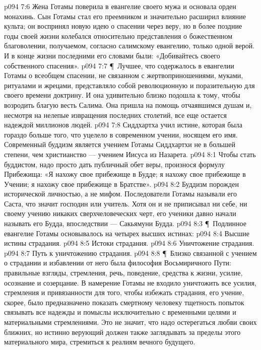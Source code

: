 \vs p094 7:6 Жена Готамы поверила в евангелие своего мужа и основала орден монахинь. Сын Готамы стал его преемником и значительно расширил влияние культа; он воспринял новую идею о спасении через веру, но в более поздние годы своей жизни колебался относительно представления о божественном благоволении, получаемом, согласно салимскому евангелию, только одной верой. И в конце жизни последними его словами были: «Добивайтесь своего собственного спасения».
\vs p094 7:7 \P\ Лучшее, что содержалось в евангелии Готамы о всеобщем спасении, не связанном с жертвоприношениями, муками, ритуалами и жрецами, представляло собой революционную и поразительную для своего времени доктрину. И она удивительно близко подошла к тому, чтобы возродить благую весть Салима. Она пришла на помощь отчаявшимся душам и, несмотря на нелепые извращения последних столетий, все еще остается надеждой миллионов людей.
\vs p094 7:8 Сиддхартха учил истине, которая была гораздо больше того, что уцелело в современном учении, носящем его имя. Современный буддизм является учением Готамы Сиддхартхи не в большей степени, чем христианство --- учением Иисуса из Назарета.
\vs p094 8:1 Чтобы стать буддистом, надо просто дать публичный обет веры, произнося формулу Прибежища: «Я нахожу свое прибежище в Будде; я нахожу свое прибежище в Учении; я нахожу свое прибежище в Братстве».
\vs p094 8:2 Буддизм порожден исторической личностью, а не мифом. Последователи Готамы называли его Саста, что значит господин или учитель. Хотя он и не приписывал ни себе, ни своему учению никаких сверхчеловеческих черт, его ученики давно начали называть его  Будда, впоследствии --- Сакьямуни Будда.
\vs p094 8:3 \P\ Подлинное евангелие Готамы основывалось на четырех высших истинах:
\vs p094 8:4 \bibnobreakspace Высшие истины страдания.
\vs p094 8:5 \bibnobreakspace Истоки страдания.
\vs p094 8:6 \bibnobreakspace Уничтожение страдания.
\vs p094 8:7 \bibnobreakspace Путь к уничтожению страдания.
\vs p094 8:8 \P\ Близко связанной с учением о страдании и избавлении от него была философия Восьмиричного Пути: правильные взгляды, стремления, речь, поведение, средства к жизни, усилие, осознание и созерцание. В намерение Готамы не входило уничтожить все усилия, стремления и привязанности для того, чтобы избежать страдания, его учение, скорее, было предназначено показать смертному человеку тщетность попыток связывать все надежды и помыслы исключительно с временными целями и материальными стремлениями. Это не значит, что надо остерегаться любви своих ближних, но истинно верующий должен также заглядывать за пределы этого материального мира, стремиться к реалиям вечного будущего.
